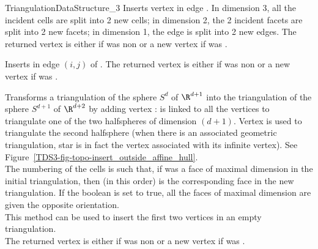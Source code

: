 \begin{ccRefConcept}{TriangulationDataStructure_3}
{Inserts vertex  in edge . In dimension 3, all the
incident cells are split into 2 new cells; in dimension 2, the 2
incident facets are split into 2 new facets; in dimension 1, the edge is 
split into 2 new edges.
The returned vertex is either  if  was non  or a new 
vertex if  was .
} 

{Inserts  in edge $(i,j)$ of .
The returned vertex is either  if  was non  or a new 
vertex if  was .
}

{Transforms a triangulation of the sphere $S^d$ of $\R^{d+1}$ into the
triangulation of the sphere $S^{d+1}$ of $\R^{d+2}$ by adding vertex :  
 is linked to all the vertices to triangulate one of the two
halfspheres of dimension $(d+1)$. Vertex  is used to
triangulate the second halfsphere (when there is an associated
geometric triangulation, star is in fact the vertex associated with
its infinite vertex). See
Figure~\ref{TDS3-fig-topo-insert_outside_affine_hull}.\\  
The numbering of the cells is such that, if  was a face of
maximal dimension in the initial triangulation, then  (in
this order) is the corresponding face in the new triangulation. If the
boolean  is set to true, all the faces of maximal
dimension are given the opposite orientation.\\
This method can be used to insert the first two vertices in an empty
triangulation.\\
The returned vertex is either  if  was non  or a new 
vertex if  was .
} 


\end{ccRefConcept}
